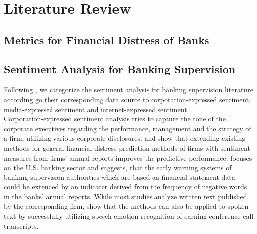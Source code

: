 \chapter{Literature Review}\label{sec3}
\thispagestyle{empty}


\section{Metrics for Financial Distress of Banks}

%
%
%




\section{Sentiment Analysis for Banking Supervision}

Following \cite{kearney2014}, we categorize the sentiment analysis for banking supervision literature according go their corresponding data source to corporation-expressed sentiment, media-expressed sentiment and internet-expressed sentiment. \\

Corporation-expressed sentiment analysis tries to capture the tone of the corporate executives regarding the performance, management and the strategy of a firm, utilizing various corporate disclosures. \cite{hajek2023} and \cite{huang2023} show that extending existing methods for general financial distress prediction methods of firms with sentiment measures from firms' annual reports improves the predictive performance. \cite{gandhi2019} focuses on the U.S. banking sector and suggests, that the early warning systems of banking supervision authorities which are based on financial statement data could be extended by an indicator derived from the frequency of negative words in the banks' annual reports. While most studies analyze written text published by the corresponding firm, \cite{hajek2023} show that the methods can also be applied to spoken text by successfully utilizing speech emotion recognition of earning conference call transcripts. \\

